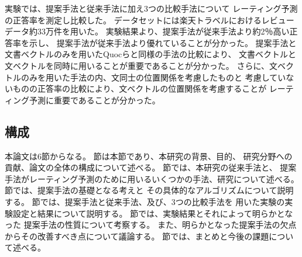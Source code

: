 実験では、提案手法と従来手法\cite{fujitani15}に加え3つの比較手法について
レーティング予測の正答率を測定し比較した。
データセットには楽天トラベルにおけるレビューデータ約33万件を用いた。
実験結果より、提案手法が従来手法\cite{fujitani15}より約2％高い正答率を示し、
提案手法が従来手法より優れていることが分かった。
提案手法と文書ベクトルのみを用いたQuocら\cite{quoc14}と同様の手法の比較により、
文書ベクトルと文ベクトルを同時に用いることが重要であることが分かった。
さらに、文ベクトルのみを用いた手法の内、文同士の位置関係を考慮したものと
考慮していないものの正答率の比較により、文ベクトルの位置関係を考慮することが
レーティング予測に重要であることが分かった。


\subsection{構成}

本論文は6節からなる。
節は本節であり、本研究の背景、目的、
研究分野への貢献、論文の全体の構成について述べる。
節では、本研究の従来手法\cite{fujitani15}と、
提案手法がレーティング予測のために用いるいくつかの手法、研究について述べる。
節では、提案手法の基礎となる考えと
その具体的なアルゴリズムについて説明する。
節では、提案手法と従来手法、及び、3つの比較手法を
用いた実験の実験設定と結果について説明する。
節では、実験結果とそれによって明らかとなった
提案手法の性質について考察する。
また、明らかとなった提案手法の欠点からその改善すべき点について議論する。
節では、まとめと今後の課題について述べる。

